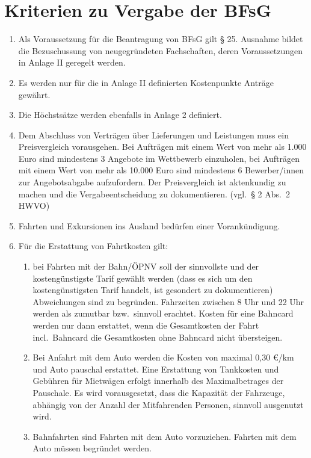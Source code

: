\documentclass{article}
\begin{document}
\section{Kriterien zu Vergabe der BFsG}
\begin{enumerate}[(1)]
    \item Als Voraussetzung für die Beantragung von BFsG gilt § 25. 
    	Ausnahme bildet die Bezuschussung von neugegründeten Fachschaften, deren Voraussetzungen in Anlage II geregelt werden.
    \item Es werden nur für die in Anlage II definierten Kostenpunkte Anträge gewährt.
    \item Die Höchstsätze werden ebenfalls in Anlage 2 definiert.
    \item Dem Abschluss von Verträgen über Lieferungen und Leistungen muss ein Preisvergleich vorausgehen. 
    	Bei Aufträgen mit einem Wert von mehr als 1.000 Euro sind mindestens 3 Angebote im Wettbewerb einzuholen, bei Aufträgen mit einem Wert von mehr als 10.000 Euro sind mindestens 6 Bewerber/innen zur Angebotsabgabe aufzufordern. 
    	Der Preisvergleich ist aktenkundig zu machen und die Vergabeentscheidung zu dokumentieren. (vgl.\ § 2 Abs.\ 2 HWVO)
    \item Fahrten und Exkursionen ins Ausland bedürfen einer Vorankündigung.
    \item Für die Erstattung von Fahrtkosten gilt:
    \begin{enumerate}[1.]
        \item bei Fahrten mit der Bahn/ÖPNV soll der sinnvollste und der kostengünstigste Tarif gewählt werden (dass es sich um den kostengünstigsten Tarif handelt, ist gesondert zu dokumentieren) Abweichungen sind zu begründen. 
        	Fahrzeiten zwischen 8 Uhr und 22 Uhr werden als zumutbar bzw.\ sinnvoll erachtet. 
        	Kosten für eine Bahncard werden nur dann erstattet, wenn die Gesamtkosten der Fahrt incl.\ Bahncard die Gesamtkosten ohne Bahncard nicht übersteigen.
        \item Bei Anfahrt mit dem Auto werden die Kosten von maximal 0,30 €/km und Auto pauschal erstattet. 
        	Eine Erstattung von Tankkosten und Gebühren für Mietwägen erfolgt innerhalb des Maximalbetrages der Pauschale. 
        	Es wird vorausgesetzt, dass die Kapazität der Fahrzeuge, abhängig von der Anzahl der Mitfahrenden Personen, sinnvoll ausgenutzt wird. 
        \item Bahnfahrten sind Fahrten mit dem Auto vorzuziehen. 
        	Fahrten mit dem Auto müssen begründet werden.

\end{enumerate}
\end{enumerate}
\end{document}
